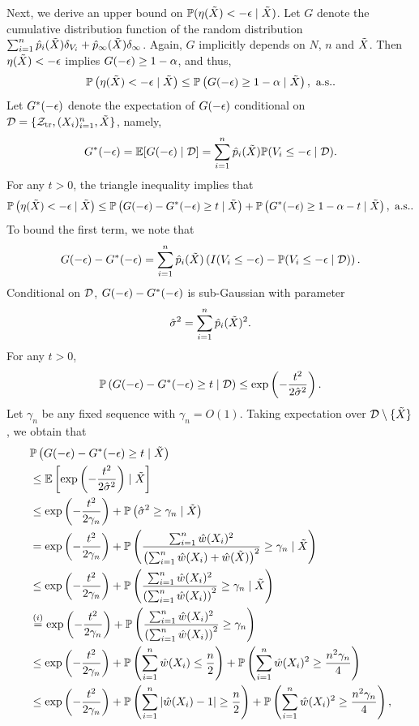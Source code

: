Next, we derive an upper bound on
  $\mathbb{P}(\eta(\tilde{X}) < -\epsilon \mid \tilde{X})$. Let $G$ denote the
  cumulative distribution function of the random distribution
  $\sum_{i=1}^{n}\hat{p}_{i}(\tilde{X})\delta_{V_{i}} +
  \hat{p}_{\infty}(\tilde{X})\delta_{\infty}$. Again, $G$ implicitly
  depends on $N$, $n$ and $\tilde{X}$. Then $\eta(\tilde{X}) < -\epsilon$
  implies $G(-\epsilon)\ge 1 - \alpha$, and thus,
\[\mathbb{P}\left(\eta(\tilde{X}) < -\epsilon\mid \tilde{X}\right)\le \mathbb{P}\left( G(-\epsilon)\ge 1 - \alpha \mid \tilde{X}\right), \,\, \text{a.s.}.\]
Let $G^{*}(-\epsilon)$ denote the expectation of $G(-\epsilon)$ conditional on
$\mathcal{D} = \{\mathcal{Z}_{\mathrm{tr}}, (X_{i})_{i=1}^{n}, \tilde{X}\}$, namely,
\[G^{*}(-\epsilon) = \mathbb{E}[G(-\epsilon)\mid \mathcal{D}] = \sum_{i=1}^{n}\hat{p}_{i}(\tilde{X})\mathbb{P}(V_{i}\le -\epsilon\mid \mathcal{D}).\]
For any $t > 0$, the triangle inequality implies that
\begin{equation}
  \label{eq:etaX1}
  \mathbb{P}\left(\eta(\tilde{X}) < -\epsilon\mid \tilde{X}\right)\le \mathbb{P}\left( G(-\epsilon) - G^{*}(-\epsilon)\ge t \mid \tilde{X}\right) + \mathbb{P}\left( G^{*}(-\epsilon)\ge 1 - \alpha - t \mid \tilde{X}\right), \,\, \text{a.s.}.
\end{equation}
To bound the first term, we note that
\[G(-\epsilon) - G^{*}(-\epsilon) = \sum_{i=1}^{n}\hat{p}_{i}(\tilde{X})\left(
  I(V_{i}\le - \epsilon) - \mathbb{P}(V_{i}\le -\epsilon\mid \mathcal{D})\right).\] Conditional on
$\mathcal{D}$, $G(-\epsilon) - G^{*}(-\epsilon)$ is sub-Gaussian with
parameter
\[\hat{\sigma}^{2} = \sum_{i=1}^{n}\hat{p}_{i}(\tilde{X})^{2}.\]
For any $t > 0$,
\[\mathbb{P}\left( G(-\epsilon) - G^{*}(-\epsilon) \ge t\mid \mathcal{D}\right)\le \exp\left(
  -\frac{t^{2}}{2\hat{\sigma}^{2}}\right).\]
Let $\gamma_{n}$ be any fixed sequence with $\gamma_{n} = O(1)$. Taking expectation over $\mathcal{D}\setminus \{\tilde{X}\}$, we obtain that
\begin{align*}
  &\mathbb{P}\left( G(-\epsilon) - G^{*}(-\epsilon) \ge t \mid \tilde{X}\right)\\
  & \le \mathbb{E}\left[\exp\left( -\frac{t^{2}}{2\hat{\sigma}^{2}}\right)\mid \tilde{X}\right] \\
  & \le \exp\left( - \frac{t^2}{2\gamma_{n}}\right) + \mathbb{P}\left(\hat{\sigma}^2 \ge \gamma_{n}\mid \tilde{X}\right)\\
  & = \exp\left( - \frac{t^2}{2\gamma_{n}}\right) + \mathbb{P}\left( \frac{\sum_{i=1}^{n}\hat{w}(X_i)^2}{\left(\sum_{i=1}^{n}\hat{w}(X_i) + \hat{w}(\tilde{X})\right)^2}\ge \gamma_{n}\mid \tilde{X}\right)\\
  & \le \exp\left( - \frac{t^2}{2\gamma_{n}}\right) + \mathbb{P}\left( \frac{\sum_{i=1}^{n}\hat{w}(X_i)^2}{\left(\sum_{i=1}^{n}\hat{w}(X_i)\right)^2}\ge \gamma_{n}\mid \tilde{X}\right)\\
  & \stackrel{(i)}{=} \exp\left( - \frac{t^2}{2\gamma_{n}}\right) + \mathbb{P}\left( \frac{\sum_{i=1}^{n}\hat{w}(X_i)^2}{\left(\sum_{i=1}^{n}\hat{w}(X_i)\right)^2}\ge \gamma_{n}\right)\\
  & \le \exp\left( - \frac{t^2}{2\gamma_{n}}\right) + \mathbb{P}\left(\sum_{i=1}^{n}\hat{w}(X_i)\le \frac{n}{2}\right) + \mathbb{P}\left(\sum_{i=1}^{n}\hat{w}(X_i)^2\ge \frac{n^2\gamma_{n}}{4}\right)\\
  & \le \exp\left( - \frac{t^2}{2\gamma_{n}}\right) + \mathbb{P}\left(\sum_{i=1}^{n}|\hat{w}(X_i) - 1|\ge \frac{n}{2}\right) + \mathbb{P}\left(\sum_{i=1}^{n}\hat{w}(X_i)^2\ge \frac{n^2\gamma_{n}}{4}\right),
\end{align*}
